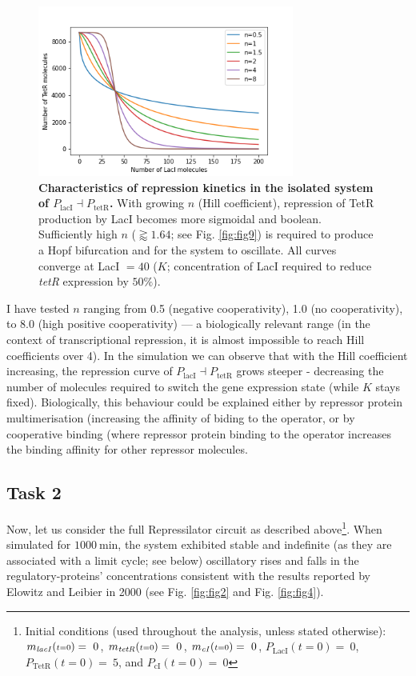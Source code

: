 \documentclass[runningheads,a4paper]{llncs}
\begin{document}
\begin{figure}
    \singlespacing
    \centering
    \includegraphics[width=0.75\textwidth]{suplementary_information_and_code/Task1_figure1.png}
    \caption{\textbf{Characteristics of repression kinetics in the isolated system of $P_{\textrm{lacI}} \dashv P_{\textrm{tetR}}$.} With growing $n$ (Hill coefficient), repression of TetR production by LacI becomes more sigmoidal and boolean. Sufficiently high $n$ ($\gtrapprox 1.64$; see Fig. \ref{fig:fig9}) is required to produce a Hopf bifurcation and for the system to oscillate. All curves converge at LacI $= 40$ ($K$; concentration of LacI required to reduce \textit{tetR} expression by $50 \%$).}
    \label{fig:fig3}
\end{figure}

I have tested $n$ ranging from 0.5 (negative cooperativity), 1.0 (no cooperativity), to 8.0 (high positive cooperativity) --- a biologically relevant range (in the context of transcriptional repression, it is almost impossible to reach Hill coefficients over 4\cite{Gonze2013a}). In the simulation we can observe that with the Hill coefficient increasing, the repression curve of $P_{\textrm{lacI}} \dashv P_{\textrm{tetR}}$ grows steeper - decreasing the number of molecules required to switch the gene expression state (while $K$ stays fixed). Biologically, this behaviour could be explained either by repressor protein multimerisation (increasing the affinity of biding to the operator, or by cooperative binding (where repressor protein binding to the operator increases the binding affinity for other repressor molecules\cite{Gonze2013a}.

\subsection*{Task 2}
Now, let us consider the full Repressilator circuit as described above\footnote{Initial conditions (used throughout the analysis, unless stated otherwise): $m_{\textrm{\textit{lacI}}}({\scriptstyle t=0}) =\ 0$, $m_{\textrm{\textit{tetR}}}({\scriptstyle t=0}) =\ 0$, $m_{\textrm{\textit{cI}}}({\scriptstyle t=0}) =\ 0$, $P_{\textrm{LacI}}({\scriptstyle t=0}) =\ 0$, $P_{\textrm{TetR}}({\scriptstyle t=0}) =\ 5$, and $P_{\textrm{cI}}({\scriptstyle t=0}) =\ 0$}. When simulated for $1000\ \textrm{min}$, the system exhibited stable and indefinite (as they are associated with a limit cycle; see below) oscillatory rises and falls in the regulatory-proteins' concentrations consistent with the results reported by Elowitz and Leibier in 2000 (see Fig. \ref{fig:fig2} and Fig. \ref{fig:fig4})\cite{Elowitz2000d}.
\end{document}
